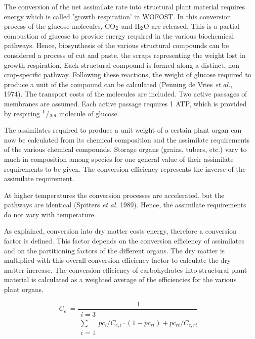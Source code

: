The conversion of the net assimilate rate into structural plant material requires energy which is
called 'growth respiration' in WOFOST.
In this conversion process of the glucose molecules, CO$_{{\rm 2}}$ and
H$_{{\rm 2}}$O are released. This is a partial combustion of glucose to provide energy required in
the various biochemical pathways. Hence, biosynthesis of the various structural compounds can 
be considered a process of cut and paste, the scraps representing the weight
lost in growth respiration.
Each structural compound is formed along a distinct, non crop-specific pathway.
Following these reactions, the weight of glucose required to produce a unit of the
compound can be calculated (Penning de Vries {\it et al.}, 1974). The transport costs of the
molecules are included. Two active passages of membranes are assumed. Each active
passage requires 1 ATP, which is provided by respiring $^{{\rm 1}}$/$_{{\rm 3}}$$_{{\rm 8}}$ molecule of glucose.

The assimilates required to produce a unit weight of a certain plant organ can now be
calculated from its chemical composition and the assimilate requirements of the various
chemical compounds. Storage organs (grains, tubers, etc.) vary to much in composition
among species for one general value of their assimilate requirements to be given. The
conversion efficiency represents the inverse of the assimilate requirement.

At higher temperatures the conversion processes are accelerated, but the pathways are
identical (Spitters {\it et al.} 1989). Hence, the assimilate requirements do not vary with
temperature. 

As explained, conversion into dry matter costs energy, therefore a conversion factor is
defined. This factor depends on the conversion efficiency of assimilates and on the
partitioning factors of the different organs. The dry matter is multiplied with this overall
conversion efficiency factor to calculate the dry matter increase. The conversion 
efficiency of carbohydrates into structural plant material is calculated as a weighted average
of the efficiencies for the various plant organs.

\begin{equation}
\label{eq:5.42}
C _{e} ~={\frac{~1}{
		\begin{array}{c}
		{i=3}  \\
		\sum  \\
		{i=1}
		\end{array} {pc_{i}}/{C_{e,i}} \cdot (1-pc_{rt} ) + {pc_{rt}}/{C_{e,rt}} 
}}
\end{equation}

